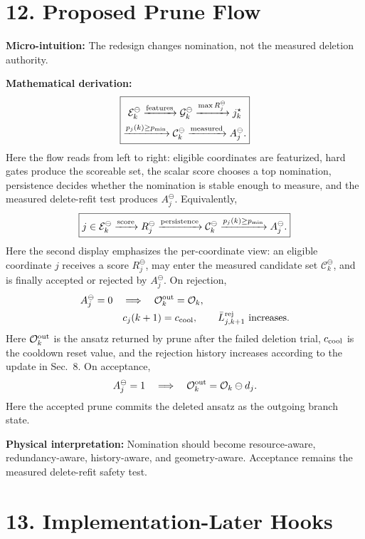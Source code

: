 \documentclass[10pt,twocolumn]{article}
\newcommand{\blk}[1]{\vspace{3pt}\noindent\textbf{#1:}\quad}
\newcommand{\Ok}{\mathcal O_k}
\newcommand{\Edel}{\mathcal E_k^{\ominus}}
\newcommand{\Gdel}{\mathcal G_k^{\ominus}}
\newcommand{\Cdel}{\mathcal C_k^{\ominus}}
\begin{document}
\section*{12. Proposed Prune Flow}

\blk{Micro-intuition}
The redesign changes nomination, not the measured deletion authority.

\blk{Mathematical derivation}
\[
\boxed{
\begin{gathered}
\Edel
\xrightarrow{\rm features}
\Gdel
\xrightarrow{\max R_j^\ominus}
j_k^\star
\\
\xrightarrow{p_j(k)\ge p_{\min}}
\Cdel
\xrightarrow{\rm measured}
A_j^\ominus.
\end{gathered}
}
\]
Here the flow reads from left to right: eligible coordinates are featurized, hard gates produce the scoreable set, the scalar score chooses a top nomination, persistence decides whether the nomination is stable enough to measure, and the measured delete-refit test produces \(A_j^\ominus\).
Equivalently,
\[
\boxed{
\begin{gathered}
j\in\Edel
\xrightarrow{\rm score}
R_j^\ominus
\xrightarrow{\rm persistence}
\Cdel
\xrightarrow{p_j(k)\ge p_{\min}}
A_j^\ominus.
\end{gathered}
}
\]
Here the second display emphasizes the per-coordinate view: an eligible coordinate \(j\) receives a score \(R_j^\ominus\), may enter the measured candidate set \(\Cdel\), and is finally accepted or rejected by \(A_j^\ominus\).
On rejection,
\[
\begin{aligned}
A_j^\ominus=0
\quad&\Longrightarrow\quad
\Ok^{\rm out}=\Ok,
\\
&c_j(k+1)=c_{\rm cool},
\qquad
\bar L_{j,k+1}^{\rm rej}\ {\rm increases}.
\end{aligned}
\]
Here \(\Ok^{\rm out}\) is the ansatz returned by prune after the failed deletion trial, \(c_{\rm cool}\) is the cooldown reset value, and the rejection history increases according to the update in Sec.~8.
On acceptance,
\[
A_j^\ominus=1
\quad\Longrightarrow\quad
\Ok^{\rm out}=\Ok\ominus d_j.
\]
Here the accepted prune commits the deleted ansatz as the outgoing branch state.

\blk{Physical interpretation}
Nomination should become resource-aware, redundancy-aware, history-aware, and geometry-aware. Acceptance remains the measured delete-refit safety test.

\section*{13. Implementation-Later Hooks}
\end{document}
